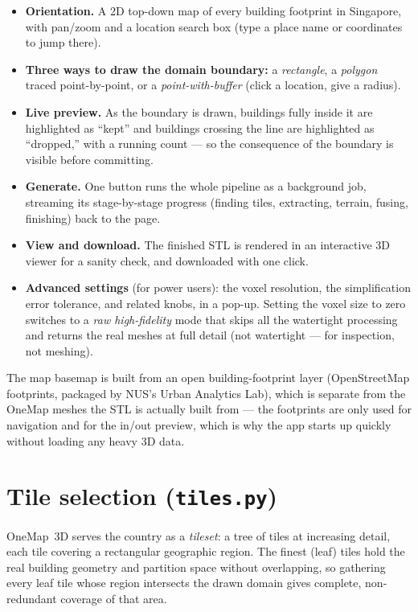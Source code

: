 \documentclass[11pt]{article}
\newcommand{\code}[1]{\texttt{#1}}
\begin{document}
\begin{itemize}[leftmargin=1.4cm]
  \item \textbf{Orientation.} A 2D top-down map of every building footprint in Singapore,
    with pan/zoom and a location search box (type a place name or coordinates to jump there).
  \item \textbf{Three ways to draw the domain boundary:} a \emph{rectangle}, a \emph{polygon}
    traced point-by-point, or a \emph{point-with-buffer} (click a location, give a radius).
  \item \textbf{Live preview.} As the boundary is drawn, buildings fully inside it are
    highlighted as ``kept'' and buildings crossing the line are highlighted as ``dropped,''
    with a running count --- so the consequence of the boundary is visible before committing.
  \item \textbf{Generate.} One button runs the whole pipeline as a background job, streaming
    its stage-by-stage progress (finding tiles, extracting, terrain, fusing, finishing) back to
    the page.
  \item \textbf{View and download.} The finished STL is rendered in an interactive 3D viewer
    for a sanity check, and downloaded with one click.
  \item \textbf{Advanced settings} (for power users): the voxel resolution, the simplification
    error tolerance, and related knobs, in a pop-up. Setting the voxel size to zero switches to
    a \emph{raw high-fidelity} mode that skips all the watertight processing and returns the
    real meshes at full detail (not watertight --- for inspection, not meshing).
\end{itemize}

The map basemap is built from an open building-footprint layer (OpenStreetMap footprints,
packaged by NUS's Urban Analytics Lab), which is separate from the OneMap meshes the STL is
actually built from --- the footprints are only used for navigation and for the in/out preview,
which is why the app starts up quickly without loading any heavy 3D data.

\section{Tile selection (\code{tiles.py})}
\label{sec:tiles}

OneMap~3D serves the country as a \emph{tileset}: a tree of tiles at increasing detail, each
tile covering a rectangular geographic region. The finest (leaf) tiles hold the real building
geometry and partition space without overlapping, so gathering every leaf tile whose region
intersects the drawn domain gives complete, non-redundant coverage of that area.
\end{document}
